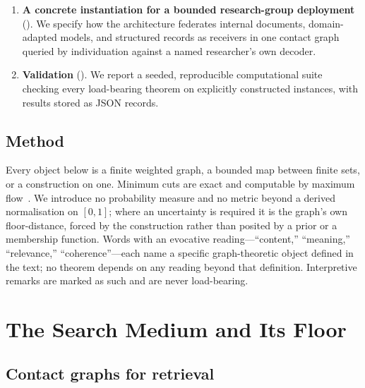 \documentclass[11pt,twocolumn,a4paper]{article}
\theoremstyle{frathm}
\theoremstyle{definition}
\theoremstyle{remark}
\begin{document}
\begin{enumerate}[leftmargin=1.4em,itemsep=2pt]
retrieve-then-generate pipeline with a society of bounded, split-attention
agents, each a node of one contact graph, coordinating via a shared
outcome space rather than a shared representation, and dividing attention
across concurrently competing sources by a provably optimal water-filling
rule.
\item \textbf{A concrete instantiation for a bounded research-group
deployment} (). We specify how the architecture
federates internal documents, domain-adapted models, and structured
records as receivers in one contact graph queried by individuation
against a named researcher's own decoder.
\item \textbf{Validation} (). We report a seeded,
reproducible computational suite checking every load-bearing theorem on
explicitly constructed instances, with results stored as JSON records.
\end{enumerate}

\subsection{Method}

Every object below is a finite weighted graph, a bounded map between
finite sets, or a construction on one. Minimum cuts are exact and
computable by maximum flow~\citep{fordfulkerson1956,menger1927}. We
introduce no probability measure and no metric beyond a derived
normalisation on $[0,1]$; where an uncertainty is required it is the
graph's own floor-distance, forced by the construction rather than
posited by a prior or a membership function. Words with an evocative
reading---``content,'' ``meaning,'' ``relevance,'' ``coherence''---each
name a specific graph-theoretic object defined in the text; no theorem
depends on any reading beyond that definition. Interpretive remarks are
marked as such and are never load-bearing.

\section{The Search Medium and Its Floor}
\label{sec:floor}

\subsection{Contact graphs for retrieval}
\end{document}
